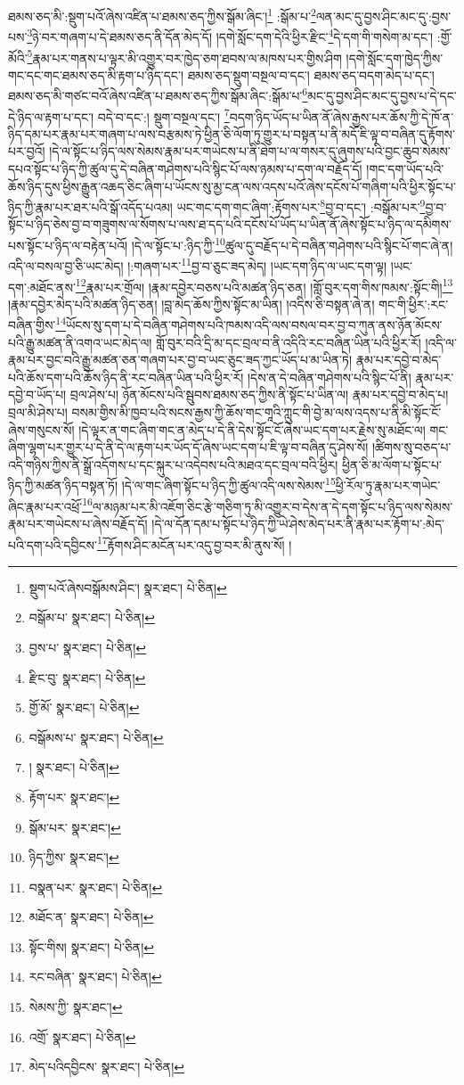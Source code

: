 ཐམས་ཅད་མི་:སྡུག་པའོ་ཞེས་འཛིན་པ་ཐམས་ཅད་ཀྱིས་སྒོམ་ཞིང་།\footnote{སྡུག་པའོ་ཞེསབསྒོམས་ཤིང་།  སྣར་ཐང་།  པེ་ཅིན། } :སྒོམ་པ་\footnote{བསྒོམ་པ་  སྣར་ཐང་།  པེ་ཅིན། }ལན་མང་དུ་བྱས་ཤིང་མང་དུ་:བྱས་པས་\footnote{བྱས་པ་  སྣར་ཐང་།  པེ་ཅིན། }ཉེ་བར་གཞག་པ་དེ་ཐམས་ཅད་ནི་དོན་མེད་དོ། །དགེ་སློང་དག་དེའི་ཕྱིར་རྫིང་\footnote{རྫིང་བུ་  སྣར་ཐང་།  པེ་ཅིན། }དེ་དག་གི་གསེག་མ་དང་། :གྱོ་མོའི་\footnote{གྱོ་མོ་  སྣར་ཐང་།  པེ་ཅིན། }རྣམ་པར་གནས་པ་ལྟར་མི་འགྱུར་བར་ཁྱེད་ཅག་ཐབས་ལ་མཁས་པར་གྱིས་ཤིག །དགེ་སློང་དག་ཁྱེད་ཀྱིས་གང་དང་གང་ཐམས་ཅད་མི་རྟག་པ་ཉིད་དང་། ཐམས་ཅད་སྡུག་བསྔལ་བ་དང་། ཐམས་ཅད་བདག་མེད་པ་དང་། ཐམས་ཅད་མི་གཙང་བའོ་ཞེས་འཛིན་པ་ཐམས་ཅད་ཀྱིས་སྒོམ་ཞིང་:སྒོམ་པ་\footnote{བསྒོམས་པ་  སྣར་ཐང་།  པེ་ཅིན། }མང་དུ་བྱས་ཤིང་མང་དུ་བྱས་པ་དེ་དང་དེ་ཉིད་ལ་རྟག་པ་དང་། བདེ་བ་དང་:། སྡུག་བསྔལ་དང་། \footnote{།    སྣར་ཐང་།  པེ་ཅིན། }བདག་ཉིད་ཡོད་པ་ཡིན་ནོ་ཞེས་རྒྱས་པར་ཆོས་ཀྱི་དེ་ཁོ་ན་ཉིད་དམ་པར་རྣམ་པར་གཞག་པ་ལས་བརྩམས་ཏེ་ཕྱིན་ཅི་ལོག་ཏུ་གྱུར་པ་བསྟན་པ་ནི་མདོ་ཇི་ལྟ་བ་བཞིན་དུ་རྟོགས་པར་བྱའོ། །དེ་ལ་སྟོང་པ་ཉིད་ལས་སེམས་རྣམ་པར་གཡེངས་པ་ནི་ཐེག་པ་ལ་གསར་དུ་ཞུགས་པའི་བྱང་ཆུབ་སེམས་དཔའ་སྟོང་པ་ཉིད་ཀྱི་ཚུལ་དུ་དེ་བཞིན་གཤེགས་པའི་སྙིང་པོ་ལས་ཉམས་པ་དག་ལ་བརྗོད་དོ། །གང་དག་ཡོད་པའི་ཆོས་ཉིད་དུས་ཕྱིས་རྒྱུན་འཆད་ཅིང་ཞིག་པ་ཡོངས་སུ་མྱ་ངན་ལས་འདས་པའོ་ཞེས་དངོས་པོ་གཞིག་པའི་ཕྱིར་སྟོང་པ་ཉིད་ཀྱི་རྣམ་པར་ཐར་པའི་སྒོ་འདོད་པའམ། ཡང་གང་དག་གང་ཞིག་:རྟོགས་པར་\footnote{རྟོག་པར་  སྣར་ཐང་། }བྱ་བ་དང་། :བསྒོམ་པར་\footnote{སྒོམ་པར་  སྣར་ཐང་། }བྱ་བ་སྟོང་པ་ཉིད་ཅེས་བྱ་བ་གཟུགས་ལ་སོགས་པ་ལས་ཐ་དད་པའི་དངོས་པོ་ཡོད་པ་ཡིན་ནོ་ཞེས་སྟོང་པ་ཉིད་ལ་དམིགས་པས་སྟོང་པ་ཉིད་ལ་བརྟེན་པའོ། །དེ་ལ་སྟོང་པ་:ཉིད་ཀྱི་\footnote{ཉིད་ཀྱིས་  སྣར་ཐང་། }ཚུལ་དུ་བརྗོད་པ་དེ་བཞིན་གཤེགས་པའི་སྙིང་པོ་གང་ཞེ་ན། འདི་ལ་བསལ་བྱ་ཅི་ཡང་མེད། །:གཞག་པར་\footnote{བསྣན་པར་  སྣར་ཐང་།  པེ་ཅིན། }བྱ་བ་ཅུང་ཟད་མེད། །ཡང་དག་ཉིད་ལ་ཡང་དག་ལྟ། །ཡང་དག་:མཐོང་ནས་\footnote{མཐོང་ན་  སྣར་ཐང་།  པེ་ཅིན། }རྣམ་པར་གྲོལ། །རྣམ་དབྱེར་བཅས་པའི་མཚན་ཉིད་ཅན། །གློ་བུར་དག་གིས་ཁམས་:སྟོང་གི།\footnote{སྟོང་གིས།  སྣར་ཐང་།  པེ་ཅིན། } །རྣམ་དབྱེར་མེད་པའི་མཚན་ཉིད་ཅན། །བླ་མེད་ཆོས་ཀྱིས་སྟོང་མ་ཡིན། །འདིས་ཅི་བསྟན་ཞེ་ན། གང་གི་ཕྱིར་:རང་བཞིན་གྱིས་\footnote{རང་བཞིན་  སྣར་ཐང་།  པེ་ཅིན། }ཡོངས་སུ་དག་པ་དེ་བཞིན་གཤེགས་པའི་ཁམས་འདི་ལས་བསལ་བར་བྱ་བ་ཀུན་ནས་ཉོན་མོངས་པའི་རྒྱུ་མཚན་ནི་འགའ་ཡང་མེད་ལ། གློ་བུར་བའི་དྲི་མ་དང་བྲལ་བ་ནི་འདིའི་རང་བཞིན་ཡིན་པའི་ཕྱིར་རོ། །འདི་ལ་རྣམ་པར་བྱང་བའི་རྒྱུ་མཚན་ཅན་གཞག་པར་བྱ་བ་ཡང་ཅུང་ཟད་ཀྱང་ཡོད་པ་མ་ཡིན་ཏེ། རྣམ་པར་དབྱེ་བ་མེད་པའི་ཆོས་དག་པའི་ཆོས་ཉིད་ནི་རང་བཞིན་ཡིན་པའི་ཕྱིར་རོ། །དེས་ན་དེ་བཞིན་གཤེགས་པའི་སྙིང་པོ་ནི། རྣམ་པར་དབྱེ་བ་ཡོད་པ། བྲལ་ཤེས་པ། ཉོན་མོངས་པའི་སྦུབས་ཐམས་ཅད་ཀྱིས་ནི་སྟོང་པ་ཡིན་ལ། རྣམ་པར་དབྱེ་བ་མེད་པ། བྲལ་མི་ཤེས་པ། བསམ་གྱིས་མི་ཁྱབ་པའི་སངས་རྒྱས་ཀྱི་ཆོས་གང་གཱའི་ཀླུང་གི་བྱེ་མ་ལས་འདས་པ་ནི་མི་སྟོང་ངོ་ཞེས་གསུངས་སོ། །དེ་ལྟར་ན་གང་ཞིག་གང་ན་མེད་པ་དེ་ནི་དེས་སྟོང་ངོ་ཞེས་ཡང་དག་པར་རྗེས་སུ་མཐོང་ལ། གང་ཞིག་ལྷག་པར་གྱུར་པ་དེ་ནི་དེ་ལ་རྟག་པར་ཡོད་དོ་ཞེས་ཡང་དག་པ་ཇི་ལྟ་བ་བཞིན་དུ་ཤེས་སོ། །ཚིགས་སུ་བཅད་པ་འདི་གཉིས་ཀྱིས་ནི་སྒྲོ་འདོགས་པ་དང་སྐུར་པ་འདེབས་པའི་མཐའ་དང་བྲལ་བའི་ཕྱིར། ཕྱིན་ཅི་མ་ལོག་པ་སྟོང་པ་ཉིད་ཀྱི་མཚན་ཉིད་བསྟན་ཏོ། །དེ་ལ་གང་ཞིག་སྟོང་པ་ཉིད་ཀྱི་ཚུལ་འདི་ལས་སེམས་\footnote{སེམས་ཀྱི་  སྣར་ཐང་། }ཕྱི་རོལ་ཏུ་རྣམ་པར་གཡེང་ཞིང་རྣམ་པར་འཕྲོ་\footnote{འགྲོ་  སྣར་ཐང་།  པེ་ཅིན། }ལ་མཉམ་པར་མི་འཇོག་ཅིང་རྩེ་གཅིག་ཏུ་མི་འགྱུར་བ་དེས་ན་དེ་དག་སྟོང་པ་ཉིད་ལས་སེམས་རྣམ་པར་གཡེངས་པ་ཞེས་བརྗོད་དོ། །དེ་ལ་དོན་དམ་པ་སྟོང་པ་ཉིད་ཀྱི་ཡེ་ཤེས་མེད་པར་ནི་རྣམ་པར་རྟོག་པ་:མེད་པའི་དག་པའི་དབྱིངས་\footnote{མེད་པའིདབྱིངས་  སྣར་ཐང་།  པེ་ཅིན། }རྟོགས་ཤིང་མངོན་པར་འདུ་བྱ་བར་མི་ནུས་སོ། །
